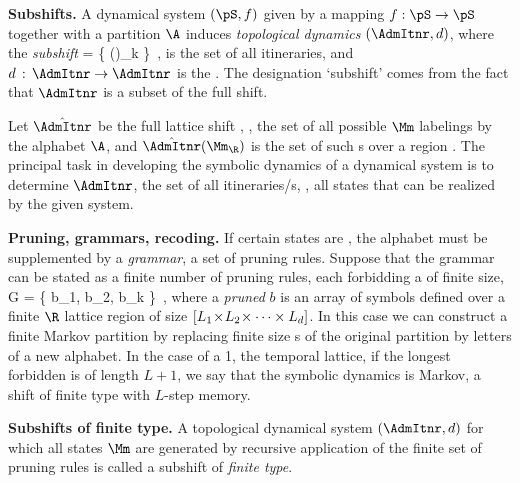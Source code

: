 {\bf Subshifts.}
A dynamical system $(\pS,f)$ given by a mapping $f : \pS \to \pS$
together with a {partition} $\A$ induces {\em topological dynamics}
$(\AdmItnr,\shift{})$, where the {\em subshift}
\beq
\AdmItnr = \{  ()_{k\in \integers} \}
\,,
is the set of all {\em \admissible} itineraries, and
$\shift{} \,:\, \AdmItnr \to \AdmItnr$
is the {\shiftOp} . The designation `subshift' comes
from the fact that $\AdmItnr$
is a subset of the full shift.

Let $\hat{\AdmItnr}$ be the full lattice shift  , \ie,
the set of all possible {\lattstate} $\Mm$ labelings by the alphabet
$\A$, and $\hat{\AdmItnr}(\Mm_{\R})$ is
the set of such {\brick s} over a region {\R}. The principal task
in developing the symbolic dynamics of a dynamical system is to determine
$\AdmItnr$, the set of all \emph{{\admissible}} itineraries/{\lattstate}s,
\ie, all states that can be realized by the given system.

{\bf Pruning, grammars, recoding.}
If certain states are {\inadmissible}, the alphabet must be supplemented by a
{\em grammar},
a set of pruning rules.
Suppose that
the grammar can be stated as a finite number of pruning rules, each
forbidding a {\brick} of finite size,
\beq
 {\cal G} = \left\{
        b_1, b_2, \cdots b_k
        \right\}
\,,
where a {\em pruned {\brick}} $b$ is an array of symbols defined over a
finite $\R$ lattice region of size
$[{L_{1}}\!\times\!{L_{2}}\!\times\cdots\times{\ensuremath{L_{d}}}]$. In
this case we can construct a finite Markov partition by replacing finite
size \brick s of the original partition by letters of a new alphabet. In
the case of a 1\dmn, the temporal lattice, if the longest forbidden {\brick}
is of length $L+1$, we say that the symbolic dynamics is Markov, a shift
of finite type with {$L$-step memory}.

{\bf Subshifts of finite type.}
A {topological dynamical system} $(\AdmItnr,\shift{})$ for which all
{\admissible} states $\Mm$ are generated by recursive application
of the finite set of pruning rules 
is called a subshift of {\em finite type}.

